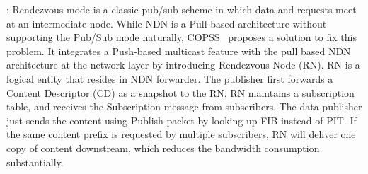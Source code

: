\vspace{1mm}: Rendezvous mode is a classic pub/sub scheme in which data and requests meet at an intermediate node. While NDN is a Pull-based architecture without supporting the Pub/Sub mode naturally,  COPSS~\cite{chen2011copss} proposes a solution to fix this problem. It integrates a Push-based multicast feature with the pull based NDN architecture at the network layer by introducing Rendezvous Node (RN). RN is a logical entity that resides in NDN forwarder. The publisher first forwards a Content Descriptor (CD) as a snapshot to the RN. RN maintains a subscription table, and receives the Subscription message from subscribers. The data publisher just sends the content using Publish packet by looking up FIB instead of PIT. If the same content prefix is requested by multiple subscribers, RN will deliver one copy  of content downstream, which reduces the bandwidth consumption substantially.

